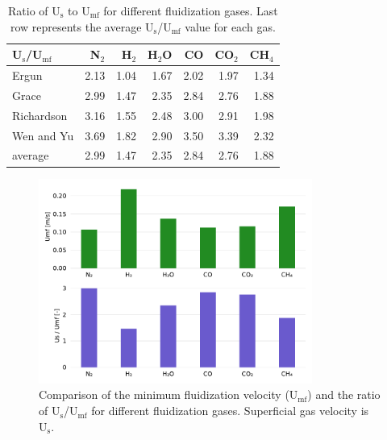\documentclass{article}
\begin{document}
\begin{table}[H]
    \centering
    \caption{Ratio of U$_\text{s}$ to U$_\text{mf}$ for different fluidization gases. Last row represents the average U$_\text{s}$/U$_\text{mf}$ value for each gas.}
    \label{tab:us-umf-ratio}
    \begin{tabular}{lrrrrrr}
        \toprule
        U$_\text{s}$/U$_\text{mf}$ & N$_2$ & H$_2$ & H$_2$O & CO & CO$_2$ & CH$_4$ \\
        \midrule
        Ergun                      & 2.13 & 1.04 & 1.67 & 2.02 & 1.97 & 1.34 \\
        Grace                      & 2.99 & 1.47 & 2.35 & 2.84 & 2.76 & 1.88 \\
        Richardson                 & 3.16 & 1.55 & 2.48 & 3.00 & 2.91 & 1.98 \\
        Wen and Yu                 & 3.69 & 1.82 & 2.90 & 3.50 & 3.39 & 2.32 \\
        average                    & 2.99 & 1.47 & 2.35 & 2.84 & 2.76 & 1.88 \\
        \bottomrule
    \end{tabular}
\end{table}

\begin{figure}[H]
    \centering
    \includegraphics[width=0.8\textwidth]{figures/umf-usumf-gases.pdf}
    \caption{Comparison of the minimum fluidization velocity (U$_\text{mf}$) and the ratio of U$_\text{s}$/U$_\text{mf}$ for different fluidization gases. Superficial gas velocity is U$_\text{s}$.}
    \label{fig:umf-usumf-gases}
\end{figure}
\end{document}
